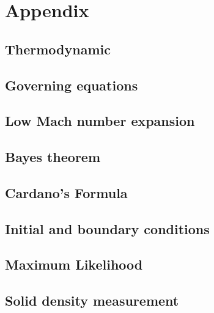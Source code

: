 \documentclass[a4paper,fleqn]{cas-dc}
\begin{document}
\clearpage \appendix \label{appendix}
\section{Appendix} 
\subsection{Thermodynamic}


\subsection{Governing equations}


\subsection{Low Mach number expansion} \label{CH:Low_Mach_chapter}
%


\subsection{Bayes theorem} \label{CH: Bayes}


\subsection{Cardano's Formula} \label{CH: Cardano}


\subsection{Initial and boundary conditions} \label{CH: IC_BC}


\subsection{Maximum Likelihood} \label{CH: ML}


\subsection{Solid density measurement} \label{CH: Solid_Density_Measurment}
\end{document}
